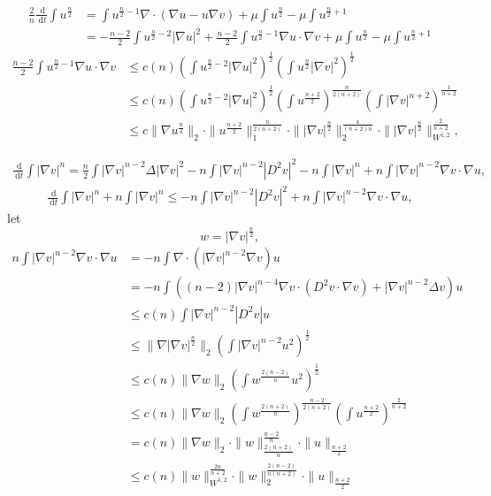 \documentclass[en,hazy,screen,blue,14pt]{elegantnote}
\numberwithin{dummy}{section}
\newcommand{\dd}{\;\mathrm{d}}
\begin{document}
\begin{align*}
	\frac2n\frac{\dd}{\dd t}\int u^{\frac n2} 
	&= \int u^{\frac n2-1}\nabla\cdot(\nabla u - u\nabla v) + \mu\int u^{\frac n2} - \mu\int u^{\frac n2+1}\\
	&= -\frac{n-2}{2}\int u^{\frac n2-2}|\nabla u|^2 
		+ \frac{n-2}{2}\int u^{\frac n2-1}\nabla u\cdot\nabla v + \mu\int u^{\frac n2} - \mu\int u^{\frac n2+1}
\end{align*}
\begin{align*}
	\frac{n-2}{2}\int u^{\frac n2-1}\nabla u\cdot\nabla v
	&\leq c(n) \left(\int u^{\frac n2-2}|\nabla u|^2\right)^{\frac12}
		\left(\int u^{\frac n2}|\nabla v|^2\right)^{\frac12}\\
	&\leq c(n) \left(\int u^{\frac n2-2}|\nabla u|^2\right)^{\frac12}
		\left(\int u^{\frac{n+2}{2}}\right)^{\frac{n}{2(n+2)}}
		\left(\int |\nabla v|^{n+2}\right)^{\frac1{n+2}}\\
	&\leq c\|\nabla u^{\frac n4}\|_2
		\cdot \|u^{\frac{n+2}{2}}\|_1^{\frac{n}{2(n+2)}}
		\cdot \||\nabla v|^{\frac n2}\|_2^{\frac{4}{(n+2)n}}
		\cdot \||\nabla v|^{\frac n2}\|_{W^{1,2}}^{\frac{2}{n+2}},
\end{align*}

\begin{align*}
	\frac{\dd}{\dd t}\int |\nabla v|^n 
	= \frac{n}{2} \int |\nabla v|^{n-2}\Delta |\nabla v|^2 - n\int |\nabla v|^{n-2}|D^2v|^2
		- n\int |\nabla v|^n 
		+ n\int |\nabla v|^{n-2}\nabla v\cdot\nabla u,
\end{align*}
\begin{align*}
	\frac{\dd}{\dd t}\int |\nabla v|^n 
		+ n\int |\nabla v|^n
	\leq - n\int |\nabla v|^{n-2}|D^2v|^2
		+ n\int |\nabla v|^{n-2}\nabla v\cdot\nabla u,
\end{align*}
let 
\[
	w=|\nabla v|^{\frac n2},
\]
\begin{align*}
	n\int |\nabla v|^{n-2}\nabla v\cdot\nabla u
	&= -n\int \nabla\cdot(|\nabla v|^{n-2}\nabla v)u \\
	&= -n\int((n-2)|\nabla v|^{n-4}\nabla v \cdot (D^2v\cdot\nabla v) + |\nabla v|^{n-2}\Delta v) u\\
	&\leq c(n)\int |\nabla v|^{n-2}|D^2v|u\\
	&\leq \|\nabla|\nabla v|^{\frac{n}{2}}\|_2\left(\int |\nabla v|^{n-2}u^2\right)^{\frac12}\\
	&\leq c(n)\|\nabla w\|_2\left(\int w^{\frac{2(n-2)}{n}}u^2\right)^{\frac12}\\
	&\leq c(n)\|\nabla w\|_2 \left(\int w^{\frac{2(n+2)}{n}}\right)^{\frac{n-2}{2(n+2)}}
		\left(\int u^{\frac{n+2}{2}}\right)^{\frac{2}{n+2}}\\
	&= c(n)\|\nabla w\|_2 
		\cdot \|w\|_{\frac{2(n+2)}{n}}^{\frac{n-2}{n}}
		\cdot \|u\|_{\frac{n+2}{2}}\\
	&\leq c(n)\|w\|_{W^{1,2}}^{\frac{2n}{n+2}}
		\cdot \|w\|_2^{\frac{2(n-2)}{n(n+2)}}
		\cdot \|u\|_{\frac{n+2}{2}}
\end{align*}
\end{document}
